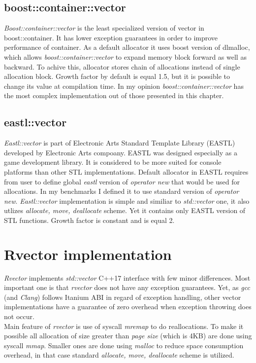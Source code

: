 \documentclass[inz, english, shortabstract]{iithesis}
\begin{document}
\section{boost::container::vector}
{\it Boost::container::vector}\cite{boost::container::vector_impl} is the least specialized version of vector in {boost::container}. It has lower exception guarantees in order to improve performance of container\cite{boost_exceptions}. As a default allocator it uses boost version of dlmalloc\cite{dlmalloc}, which allows {\it boost::container::vector} to expand memory block forward as well as backward. To achive this, allocator stores chain of allocations instead of single allocation block. Growth factor by default is equal 1.5, but it is possible to change its value at compilation time. In my opinion {\it boost::container::vector} has the most complex implementation out of those presented in this chapter.

\section{eastl::vector}
{\it Eastl::vector}\cite{eastl::vector_impl} is part of Electronic Arts Standard Template Library (EASTL) developed by Electronic Arts compoany. EASTL was designed especially as a game development library. It is considered to be more suited for console platforms\cite{eastl_faq} than other STL implementations. Default allocator in EASTL requires from user to define global {\it eastl} version of {\it operator new} that would be used for allocations. In my benchmarks I defined it to use standard version of {\it operator new}. {\it Eastl::vector} implementation is simple and similiar to {\it std::vector} one, it also utlizes {\it allocate, move, deallocate} scheme. Yet it contains only EASTL version of STL functions. Growth factor is constant and is equal 2.  


\chapter{Rvector implementation}
{\it Rvector}\cite{rvector_impl} implements {\it std::vector} C++17 interface with few minor differences. Most important one is that {\it rvector} does not have any exception guarantees. Yet, as {\it gcc} (and {\it Clang}) follows Itanium ABI\cite{Itanium_ABI} in regard of exception handling, other vector implementations have a guarantee of zero overhead when exception throwing does not occur. \\
Main feature of {\it rvector} is use of syscall {\it mremap} to do reallocations. To make it possible all allocation of size greater than {\it page size} (which is 4KB) are done using syscall {\it mmap}. Smaller ones are done using {\it malloc} to reduce space consumption overhead, in that case standard {\it allocate, move, deallocate} scheme is utilized.
\end{document}
